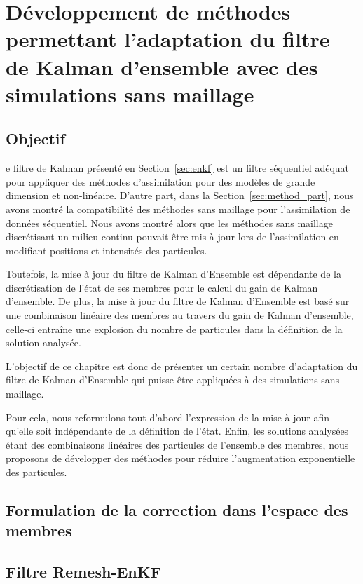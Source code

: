 
\section{Développement de méthodes permettant l'adaptation du filtre de Kalman d'ensemble avec des simulations sans maillage}

\subsection{Objectif}
e filtre de Kalman présenté en Section~\ref*{sec:enkf} est un filtre séquentiel adéquat pour appliquer des méthodes d'assimilation pour des modèles de grande dimension et non-linéaire. D'autre part, dans la Section~\ref{sec:method_part}, nous avons montré la compatibilité des méthodes sans maillage pour l'assimilation de données séquentiel. Nous avons montré alors que les méthodes sans maillage discrétisant un milieu continu pouvait être mis à jour lors de l'assimilation en modifiant positions et intensités des particules.

Toutefois, la mise à jour du filtre de Kalman d'Ensemble est dépendante de la discrétisation de l'état de ses membres pour le calcul du gain de Kalman d'ensemble. De plus, la mise à jour du filtre de Kalman d'Ensemble est basé sur une combinaison linéaire des membres au travers du gain de Kalman d'ensemble, celle-ci entraîne une explosion du nombre de particules dans la définition de la solution analysée.

L'objectif de ce chapitre est donc de présenter un certain nombre d'adaptation du filtre de Kalman d'Ensemble qui puisse être appliquées à des simulations sans maillage.

Pour cela, nous reformulons tout d'abord l'expression de la mise à jour afin qu'elle soit indépendante de la définition de l'état.
Enfin, les solutions analysées étant des combinaisons linéaires des particules de l'ensemble des membres, nous proposons de développer des méthodes pour réduire l'augmentation exponentielle des particules.

\subsection{Formulation de la correction dans l'espace des membres}

\subsection{Filtre Remesh-EnKF}
